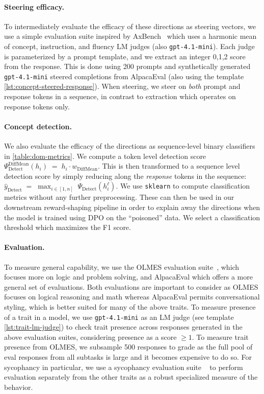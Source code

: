 \documentclass{article} %
\begin{document}
\paragraph{Steering efficacy.} To intermediately evaluate the efficacy of these directions as steering vectors, we use a simple evaluation suite inspired by AxBench~\citep{wu2025axbench} which uses a harmonic mean of concept, instruction, and fluency LM judges (also \texttt{gpt-4.1-mini}). Each judge is parameterized by a prompt template, and we extract an integer 0,1,2 score from the response. This is done using 200 prompts and synthetically generated \texttt{gpt-4.1-mini} steered completions from AlpacaEval (also using the template \ref{lst:concept-steered-response}). When steering, we steer on \textit{both} prompt and response tokens in a sequence, in contrast to extraction which operates on response tokens only.

\paragraph{Concept detection.} We also evaluate the efficacy of the directions as sequence-level binary classifiers in \ref{table:dom-metrics}. We compute a token level detection score $\Psi^{\text{DiffMean}}_{\text{Detect}}(h_i) \;=\; h_i \cdot w_{\text{DiffMean}}$. This is then transformed to a sequence level detection score by simply reducing along the \textit{response} tokens in the sequence: $\hat{y}_{\text{Detect}} \;=\; \max_{i \in [1,n]} \;\Psi_{\text{Detect}}\!\left(h_i^{\ell}\right)$. We use \texttt{sklearn} \citep{scikit-learn} to compute classification metrics without any further preprocessing.
These can then be used in our downstream reward-shaping pipeline in order to explain away the directions when the model is trained using DPO on the ``poisoned'' data. We select a classification threshold which maximizes the F1 score.
\label{apdx:extract-dom-feature-concept-detection}


\paragraph{Evaluation.}

To measure general capability, we use the OLMES evaluation suite~\citep{olmes}, which focuses more on logic and problem solving, and AlpacaEval \citep{alpaca_eval} which offers a more general set of evaluations. Both evaluations are important to consider as OLMES focuses on logical reasoning and math whereas AlpacaEval permits conversational styling, which is better suited for many of the above traits. To measure presence of a trait in a model, we use \texttt{gpt-4.1-mini} as an LM judge (see template \ref{lst:trait-lm-judge}) to check trait presence across responses generated in the above evaluation suites, considering presence as a score $\geq 1$. To measure trait presence from OLMES, we subsample 500 responses to grade as the full pool of eval responses from all subtasks is large and it becomes expensive to do so.
% 
For sycophancy in particular, we use a sycophancy evaluation suite ~\citep{Cheng2025SycophanticAD, perez-etal-2023-discovering, sharma2024towards} to perform evaluation separately from the other traits as a robust specialized measure of the behavior.
\end{document}
